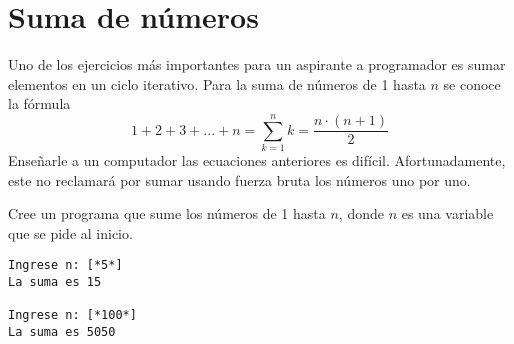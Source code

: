 
\section{Suma de números}

Uno de los ejercicios más importantes para un aspirante a programador es sumar elementos en un ciclo iterativo. Para la suma de números de 1 hasta $n$ se conoce la fórmula
\begin{equation*}
    1+2+3+...+n=\sum_{k=1}^{n} k = \frac{n\cdot (n+1)}{2}
\end{equation*}
Enseñarle a un computador las ecuaciones anteriores es difícil. Afortunadamente, este no reclamará por sumar usando fuerza bruta los números uno por uno.

Cree un programa que sume los números de 1 hasta $n$, donde $n$ es una variable que se pide al inicio.

\begin{lstlisting}[style=consola]
Ingrese n: [*5*]
La suma es 15

Ingrese n: [*100*]
La suma es 5050
\end{lstlisting}
